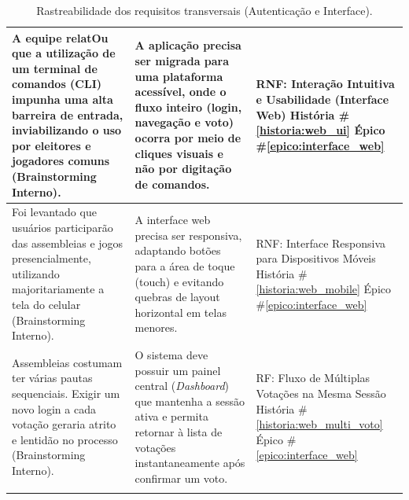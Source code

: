 \documentclass[12pt,a4paper]{article}
\newcounter{epico}
\newcounter{historia}
\begin{document}
\begin{longtable}{|p{7cm}|p{4.5cm}|p{4.5cm}|}
    \hline
    
    A equipe relatOu que a utilização de um terminal de comandos (CLI) impunha uma alta barreira de entrada, inviabilizando o uso por eleitores e jogadores comuns (Brainstorming Interno).
    & A aplicação precisa ser migrada para uma plataforma acessível, onde o fluxo inteiro (login, navegação e voto) ocorra por meio de cliques visuais e não por digitação de comandos.
    & RNF: Interação Intuitiva e Usabilidade (Interface Web)
    \newline \newline História \#\ref{historia:web_ui} 
    \newline \newline Épico \#\ref{epico:interface_web} \\

    \hline

    Foi levantado que usuários participarão das assembleias e jogos presencialmente, utilizando majoritariamente a tela do celular (Brainstorming Interno).
    & A interface web precisa ser responsiva, adaptando botões para a área de toque (touch) e evitando quebras de layout horizontal em telas menores.
    & RNF: Interface Responsiva para Dispositivos Móveis
    \newline \newline História \#\ref{historia:web_mobile} 
    \newline \newline Épico \#\ref{epico:interface_web} \\
    
    \hline

    Assembleias costumam ter várias pautas sequenciais. Exigir um novo login a cada votação geraria atrito e lentidão no processo (Brainstorming Interno).
    & O sistema deve possuir um painel central (\textit{Dashboard}) que mantenha a sessão ativa e permita retornar à lista de votações instantaneamente após confirmar um voto.
    & RF: Fluxo de Múltiplas Votações na Mesma Sessão
    \newline \newline História \#\ref{historia:web_multi_voto} 
    \newline \newline Épico \#\ref{epico:interface_web} \\

    \hline
    \caption{Rastreabilidade dos requisitos transversais (Autenticação e Interface).}
\end{longtable}
\end{document}
